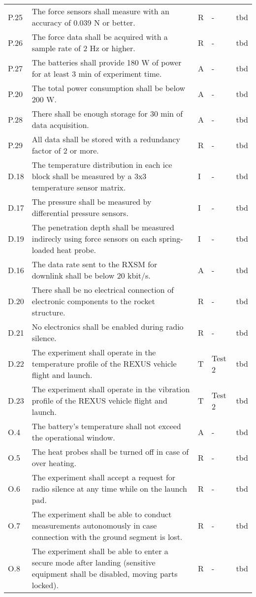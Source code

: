 \documentclass[11pt]{scrartcl}
\begin{document}
\begin{center}
\begin{longtable}{| p{} | p{} | p{} | p{} | p{} |}
		P.25 & The force sensors shall measure with an accuracy of 0.039 N or better. & R & - & tbd \\
		P.26 & The force data shall be acquired with a sample rate of 2 Hz or higher. & R & - & tbd \\
		P.27 & The batteries shall provide 180 W of power for at least 3 min of experiment time. & A & - & tbd \\
		P.20 & The total power consumption shall be below 200 W. & A & - & tbd \\
		P.28 & There shall be enough storage for 30 min of data acquisition. & A & - & tbd \\
		P.29 & All data shall be stored with a redundancy factor of 2 or more. & R & - & tbd \\
		\hline
		D.18 & The temperature distribution in each ice block shall be measured by a 3x3 temperature sensor matrix. & I & - & tbd \\
		D.17 & The pressure shall be measured by differential pressure sensors. & I & - & tbd \\
		D.19 & The penetration depth shall be measured indirecly using force sensors on each spring-loaded heat probe. & I & - & tbd \\
		D.16 & The data rate sent to the RXSM for downlink shall be below 20 kbit/s. & A & - & tbd \\
		D.20 & There shall be no electrical connection of electronic components to the rocket structure. & R & - & tbd \\
		D.21 & No electronics shall be enabled during radio silence. & R & - & tbd \\
		D.22 & The experiment shall operate in the temperature profile of the REXUS vehicle flight and launch. & T & Test 2 & tbd \\
		D.23 & The experiment shall operate in the vibration profile of the REXUS vehicle flight and launch. & T & Test 2 & tbd \\
		\hline
		O.4 & The battery’s temperature shall not exceed the operational window. & A & - & tbd \\
		O.5 & The heat probes shall be turned off in case of over heating. & R & - & tbd \\
		O.6 & The experiment shall accept a request for radio silence at any time while on the launch pad. & R & - & tbd \\
		O.7 & The experiment shall be able to conduct measurements autonomously in case connection with the ground segment is lost. & R & - & tbd \\
		O.8 & The experiment shall be able to enter a secure mode after landing (sensitive equipment shall be disabled, moving parts locked). & R & - & tbd \\
		\hline
	\end{longtable}
\end{center}
 
\end{document}
